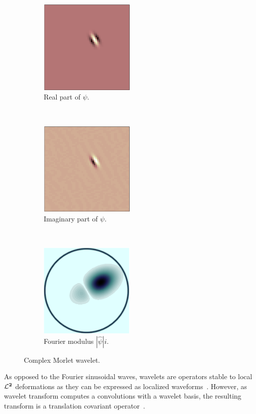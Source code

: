 \documentclass[a4paper,11pt]{report}
\begin{document}
			\begin{figure}[h]
				\centering
				\begin{subfigure}[t]{0.3\textwidth}
					\centering
					\includegraphics[height=1.8in]{morlet_real.eps}
					\caption{\centering Real part of $\psi$.}
				\end{subfigure}%
				~
				\begin{subfigure}[t]{0.3\textwidth}
					\centering
					\includegraphics[height=1.8in]{morlet_ima.eps}
					\caption{\centering Imaginary part  of $\psi$.}
				\end{subfigure}%
				~ 
				\begin{subfigure}[t]{0.3\textwidth}
					\centering
					\includegraphics[height=1.8in]{morlet_fourier.eps}
					\caption{\centering Fourier modulus $|\hat{\psi}|i$.}
				\end{subfigure}				
				\caption{Complex Morlet wavelet.}
				\label{fig:Morlet wavelet}
			\end{figure}

      As opposed to the Fourier sinusoidal waves, wavelets are operators stable to local $\mathbf{\mathcal{L}^{2}}$ deformations as they can be expressed as localized waveforms~\citep{mallat1999wavelet}. However, as wavelet transform computes a convolutions with a wavelet basis, the resulting transform is a translation covariant operator~\citep{bruna2013invariant}.\\
        
\end{document}
